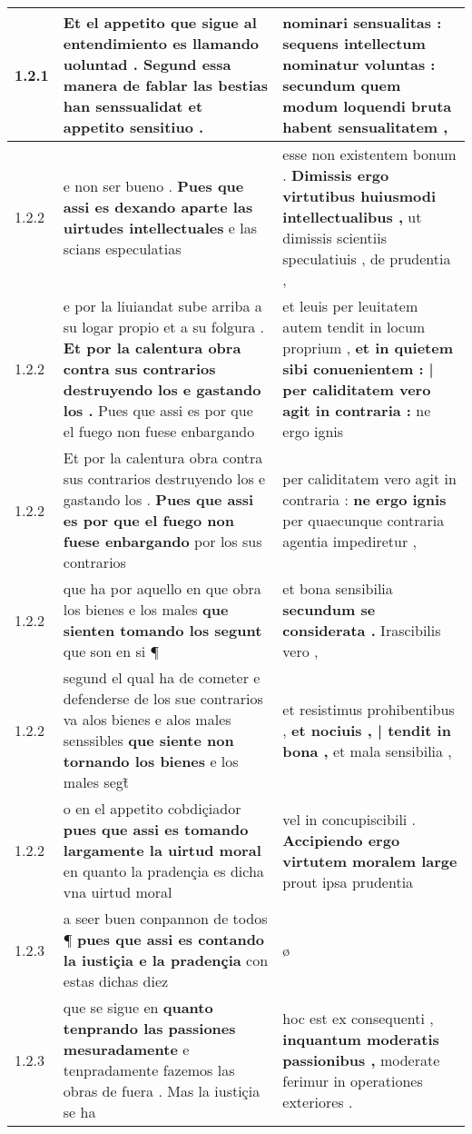 \begin{tabular}{|p{1cm}|p{6.5cm}|p{6.5cm}|}
1.2.1 & Et el appetito que sigue al entendimiento \textbf{ es llamando uoluntad . } Segund essa manera de fablar las bestias han senssualidat et appetito sensitiuo . & nominari sensualitas : \textbf{ sequens intellectum nominatur voluntas : } secundum quem modum loquendi bruta habent sensualitatem , \\\hline
1.2.2 & e non ser bueno . \textbf{ Pues que assi es dexando aparte las uirtudes intellectuales } e las scians especulatias & esse non existentem bonum . \textbf{ Dimissis ergo virtutibus huiusmodi intellectualibus , } ut dimissis scientiis speculatiuis , de prudentia , \\\hline
1.2.2 & e por la liuiandat sube arriba a su logar propio et a su folgura . \textbf{ Et por la calentura obra contra sus contrarios destruyendo los e gastando los . } Pues que assi es por que el fuego non fuese enbargando & et leuis per leuitatem autem tendit in locum proprium , \textbf{ et in quietem sibi conuenientem : | per caliditatem vero agit in contraria : } ne ergo ignis \\\hline
1.2.2 & Et por la calentura obra contra sus contrarios destruyendo los e gastando los . \textbf{ Pues que assi es por que el fuego non fuese enbargando } por los sus contrarios & per caliditatem vero agit in contraria : \textbf{ ne ergo ignis } per quaecunque contraria agentia impediretur , \\\hline
1.2.2 & que ha por aquello en que obra los bienes e los males \textbf{ que sienten tomando los segunt } que son en si ¶ & et bona sensibilia \textbf{ secundum se considerata . } Irascibilis vero , \\\hline
1.2.2 & segund el qual ha de cometer e defenderse de los sue contrarios va alos bienes e alos males senssibles \textbf{ que siente non tornando los bienes } e los males segt̃ & et resistimus prohibentibus , \textbf{ et nociuis , | tendit in bona , } et mala sensibilia , \\\hline
1.2.2 & o en el appetito cobdiçiador \textbf{ pues que assi es tomando largamente la uirtud moral } en quanto la pradençia es dicha vna uirtud moral & vel in concupiscibili . \textbf{ Accipiendo ergo virtutem moralem large } prout ipsa prudentia \\\hline
1.2.3 & a seer buen conpannon de todos ¶ \textbf{ pues que assi es contando la iustiçia e la pradençia } con estas dichas diez & ø \\\hline
1.2.3 & que se sigue en \textbf{ quanto tenprando las passiones mesuradamente } e tenpradamente fazemos las obras de fuera . Mas la iustiçia se ha & hoc est ex consequenti , \textbf{ inquantum moderatis passionibus , } moderate ferimur in operationes exteriores . \\\hline

\end{tabular}

